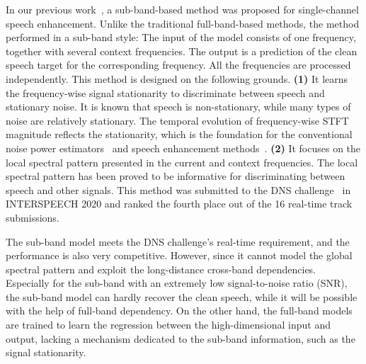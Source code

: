 \documentclass{article}
\begin{document}
In our previous work~\cite{li_narrow-band_2019}, a sub-band-based method was proposed for single-channel speech enhancement.
Unlike the traditional full-band-based methods, the method performed in a sub-band style:
The input of the model consists of one frequency, together with several context frequencies. The output is a prediction of the clean speech target for the corresponding frequency.
All the frequencies are processed independently.
This method is designed on the following grounds.
\textbf{(1)} It learns the frequency-wise signal stationarity to discriminate between speech and stationary noise. It is known that speech is non-stationary, while many types of noise are relatively stationary. The temporal evolution of frequency-wise STFT magnitude reflects the stationarity, which is the foundation for the conventional noise power estimators~\cite{power_est_1,power_est_2} and speech enhancement methods~\cite{conventional_se_1, conventional_se_2}.
\textbf{(2)} It focuses on the local spectral pattern presented in the current and context frequencies. The local spectral pattern has been proved to be informative for discriminating between speech and other signals.
This method was submitted to the DNS challenge~\cite{dns_challege} in INTERSPEECH 2020 and ranked the fourth place out of the 16 real-time track submissions.

The sub-band model meets the DNS challenge's real-time requirement, and the performance is also very competitive.
However, since it cannot model the global spectral pattern and exploit the long-distance cross-band dependencies. Especially for the sub-band with an extremely low signal-to-noise ratio (SNR), the sub-band model can hardly recover the clean speech, while it will be possible with the help of full-band dependency. On the other hand, the full-band models~\cite{regression_approch, se_overview} are trained to learn the regression between the high-dimensional input and output, lacking a mechanism dedicated to the sub-band information, such as the signal stationarity.
\end{document}
